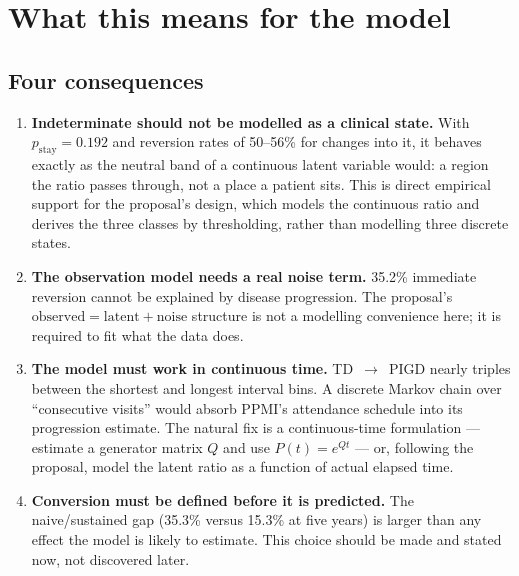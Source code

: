 \documentclass[11pt,a4paper]{article}
\newcommand{\arr}{$\rightarrow$}
\begin{document}
\clearpage

\section{What this means for the model}

\subsection{Four consequences}

\begin{enumerate}
  \item \textbf{Indeterminate should not be modelled as a clinical state.} With
        $p_{\text{stay}} = 0.192$ and reversion rates of 50--56\% for changes
        into it, it behaves exactly as the neutral band of a continuous latent
        variable would: a region the ratio passes through, not a place a
        patient sits. This is direct empirical support for the proposal's
        design, which models the continuous ratio and derives the three classes
        by thresholding, rather than modelling three discrete states.

  \item \textbf{The observation model needs a real noise term.} 35.2\%
        immediate reversion cannot be explained by disease progression. The
        proposal's $\text{observed} = \text{latent} + \text{noise}$ structure is
        not a modelling convenience here; it is required to fit what the data
        does.

  \item \textbf{The model must work in continuous time.} TD~\arr~PIGD nearly
        triples between the shortest and longest interval bins. A discrete
        Markov chain over ``consecutive visits'' would absorb PPMI's attendance
        schedule into its progression estimate. The natural fix is a
        continuous-time formulation --- estimate a generator matrix $Q$ and use
        $P(t) = e^{Qt}$ --- or, following the proposal, model the latent ratio
        as a function of actual elapsed time.

  \item \textbf{Conversion must be defined before it is predicted.} The
        naive/sustained gap (35.3\% versus 15.3\% at five years) is larger than
        any effect the model is likely to estimate. This choice should be made
        and stated now, not discovered later.
\end{enumerate}
\end{document}
